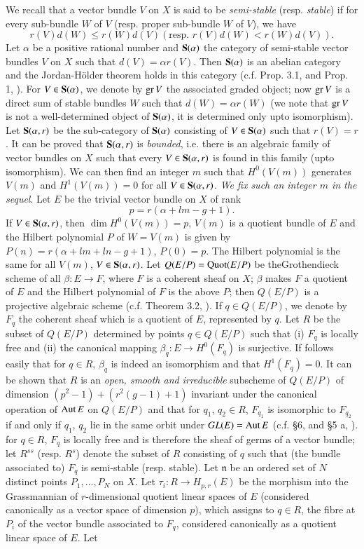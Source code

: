We recall that a vector bundle $V$ on $X$ is said to be {\em semi-stable} (resp. {\em stable}) if for every sub-bundle $W$ of $V$ (resp. proper sub-bundle $W$ of $V$), we have
$$
r(V)d(W)\leq r(W)d(V)(\text{resp.~} r(V)d(W)<r(W)d(V)).
$$
Let $\alpha$ be a positive rational number and $\mathbf{S}(\alpha)$ the category of semi-stable vector bundles $V$ on $X$ such that $d(V)=\alpha r(V)$. Then $\mathbf{S}(\alpha)$ is an abelian category and the Jordan-H\"older theorem holds in this category (c.f. Prop. 3.1, \cite{art18-key12} and Prop. 1, \cite{art18-key10}). For $V\in \mathbf{S}(\alpha)$, we denote by $\operatorname{\mathrm{gr}} V$ the associated graded object; now $\operatorname{\mathrm{gr}} V$ is a direct sum of stable bundles $W$ such that $d(W)=\alpha r(W)$ (we note that $\operatorname{\mathrm{gr}} V$ is not a well-determined object of $\mathbf{S}(\alpha)$, it is determined only upto isomorphism). Let $\mathbf{S}(\alpha,r)$ be the sub-category of $\mathbf{S}(\alpha)$ consisting of $V\in \mathbf{S}(\alpha)$ such that $r(V)=r$. It can be proved that $\mathbf{S}(\alpha,r)$ is {\em bounded}, i.e. there is an algebraic family of vector bundles on $X$ such that every $V\in \mathbf{S}(\alpha,r)$ is found in this family (upto isomorphism). We can then find an integer $m$ such that $H^{0}(V(m))$ generates $V(m)$ and $H^{1}(V(m))=0$ for all $V\in \mathbf{S}(\alpha,r)$. {\em We fix such an integer $m$ in the sequel}. Let $E$ be the trivial vector bundle on $X$ of rank
$$
p=r(\alpha+lm-g+1).
$$
If $V\in \mathbf{S}(\alpha,r)$, then $\dim H^{0}(V(m))=p$, $V(m)$ is a quotient bundle of $E$ and the Hilbert polynomial $P$ of $W=V(m)$ is given by $P(n)=r(\alpha+lm+ln-g+1)$, $P(0)=p$. The Hilbert polynomial is the same for all $V(m)$, $V\in \mathbf{S}(\alpha,r)$. Let $Q(E/P)=\operatorname{\mathrm{Quot}} (E/P)$ be the\pageoriginale Grothendieck scheme of all $\beta:E\to F$, where $F$ is a coherent sheaf on $X$; $\beta$ makes $F$ a quotient of $E$ and the Hilbert polynomial of $F$ is the above $P$; then $Q(E/P)$ is a projective algebraic scheme (c.f. Theorem 3.2, \cite{art18-key3}). If $q\in Q(E/P)$, we denote by $F_{q}$ the coherent sheaf which is a quotient of $E$, represented by $q$. Let $R$ be the subset of $Q(E/P)$ determined by points $q\in Q(E/P)$ such that (i) $F_{q}$ is locally free and (ii) the canonical mapping $\beta_{q}:E\to H^{0}(F_{q})$ is surjective. If follows easily that for $q\in R$, $\beta_{q}$ is indeed an isomorphism and that $H^{1}(F_{q})=0$. It can be shown that $R$ is an {\em open, smooth and irreducible} subscheme of $Q(E/P)$ of dimension $(p^{2}-1)+(r^{2}(g-1)+1)$ invariant under the canonical operation of $\operatorname{\mathrm{Aut}} E$ on $Q(E/P)$ and that for $q_{1}$, $q_{2}\in R$, $F_{q_{1}}$ is isomorphic to $F_{q_{2}}$ if and only if $q_{1}$, $q_{2}$ lie in the same orbit under $GL(E)=\operatorname{\mathrm{Aut}} E$ (c.f. \S6, \cite{art18-key12} and \S5 a, \cite{art18-key10}). for $q\in R$, $F_{q}$ is locally free and is therefore the sheaf of germs of a vector bundle; let $R^{ss}$ (resp. $R^{s}$) denote the subset of $R$ consisting of $q$ such that (the bundle associated to) $F_{q}$ is semi-stable (resp. stable). Let $\mathfrak{n}$ be an ordered set of $N$ distinct points $P_{1},\ldots,P_{N}$ on $X$. Let $\tau_{i}:R\to H_{p,r}(E)$ be the morphism into the Grassmannian of $r$-dimensional quotient linear spaces of $E$ (considered canonically as a vector space of dimension $p$), which assigns to $q\in R$, the fibre at $P_{i}$ of the vector bundle associated to $F_{q}$, considered canonically as a quotient linear space of $E$. Let
